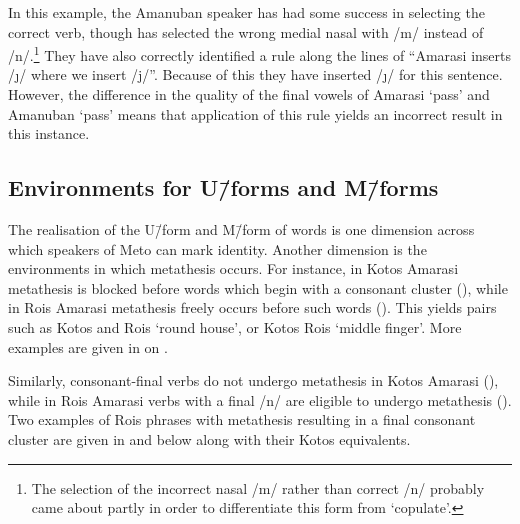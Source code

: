 In this example, the Amanuban speaker has had some success
in selecting the correct verb, though has selected the wrong medial nasal with /m/ instead of /n/.\footnote{
		The selection of the incorrect nasal /m/ rather than correct
		/n/ probably came about partly in order to differentiate
		this form from  `copulate'.}
They have also correctly identified a rule along the lines of
``Amarasi inserts /\j/ where we insert /j/''.
Because of this they have inserted /\j/ for this sentence.
However, the difference in the quality of the final vowels of
Amarasi  `pass' and Amanuban  `pass'
means that application of this rule yields an incorrect result in this instance.

\subsection{Environments for U\=/forms and M\=/forms}
The realisation of the U\=/form and M\=/form of words
is one dimension across which speakers of Meto can mark identity.
Another dimension is the environments in which metathesis occurs.
For instance, in Kotos Amarasi metathesis is blocked before words
which begin with a consonant cluster (),
while in Ro{\Q}is Amarasi metathesis freely occurs
before such words ().
This yields pairs such as Kotos  and Ro{\Q}is  `round house',
or Kotos  Ro{\Q}is  `middle finger'.
More examples are given in  on .

Similarly, consonant-final verbs do not undergo
metathesis in Kotos Amarasi (),
while in Ro{\Q}is Amarasi verbs with a final /n/ are eligible
to undergo metathesis ().
Two examples of Ro{\Q}is phrases with metathesis
resulting in a final consonant cluster are given in 
and  below along with their Kotos equivalents.

\begin{multicols}{2}
	\begin{exe}\let\eachwordtwo=\itshape
		\label{ex:08/10/14, p.113 ch:ConCon}
		\label{ex:09/10/14, p.114 ch:ConCon}
	\end{exe}
\end{multicols}

